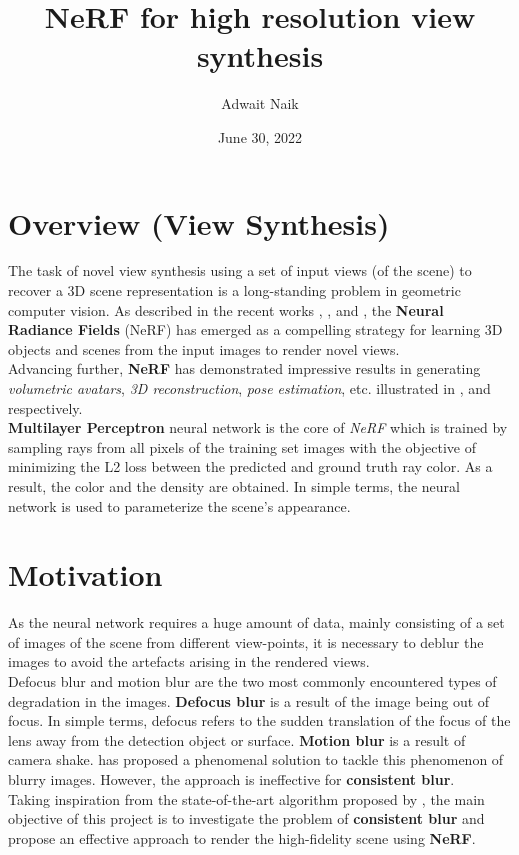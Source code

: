 \documentclass{article}
\title{NeRF for high resolution view synthesis}
\author{Adwait Naik}
\date{June 30, 2022}
\begin{document}
\maketitle
\section*{Overview (View Synthesis)}
The task of novel view synthesis using a set of input views (of the scene) to recover a 3D scene representation is a long-standing problem in geometric computer vision. As described in the recent works \cite{dellaert2020neural}, \cite{huang2022hdr}, and \cite{li2022neural}, the \textbf{Neural Radiance Fields} (NeRF) has emerged as a compelling strategy for learning 3D objects and scenes from the input images to render novel views. \\ \newline Advancing further, \textbf{NeRF} has demonstrated impressive results in generating \textit{volumetric avatars}, \textit{3D reconstruction}, \textit{pose estimation}, etc. illustrated in \cite{park2021hypernerf}, and \cite{martin2021nerf} respectively. \\ \newline
\textbf{Multilayer Perceptron} neural network is the core of \textit{NeRF} which is trained by sampling rays from all pixels of the training set images with the objective of minimizing the L2 loss between the predicted and ground truth ray color. As a result, the color and the density are obtained. In simple terms, the neural network is used to parameterize the scene's appearance.
\section*{Motivation}
As the neural network requires a huge amount of data, mainly consisting of a set of images of the scene from different view-points, it is necessary to deblur the images to avoid the artefacts arising in the rendered views. \\ \newline Defocus blur and motion blur are the two most commonly encountered types of degradation in the images. \textbf{Defocus blur} is a result of the image being out of focus. In simple terms, defocus refers to the sudden translation of the focus of the lens away from the detection object or surface. \textbf{Motion blur} is a result of camera shake. \cite{ma2022deblur} has proposed a phenomenal solution to tackle this phenomenon of blurry images. However, the approach is ineffective for \textbf{consistent blur}. \\ \newline
Taking inspiration from the state-of-the-art algorithm proposed by \cite{ma2022deblur}, the main objective of this project is to investigate the problem of \textbf{consistent blur} and propose an effective approach to render the high-fidelity scene using \textbf{NeRF}.
\printbibliography
\end{document}
